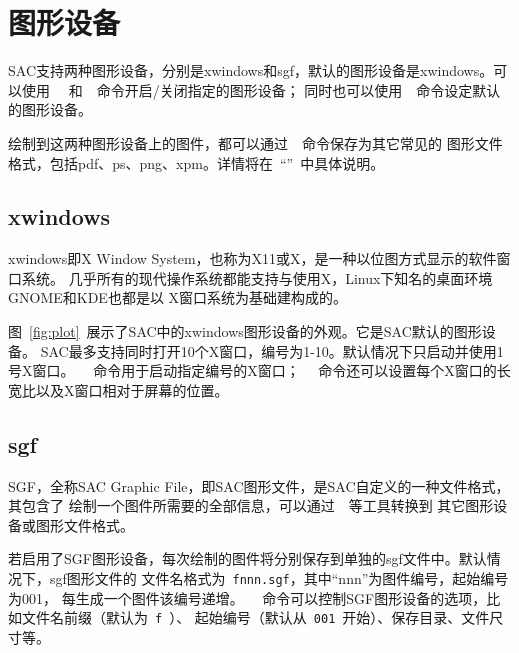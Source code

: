 \section{图形设备}
SAC支持两种图形设备，分别是xwindows和sgf，默认的图形设备是xwindows。可以使用
~~和~~命令开启/关闭指定的图形设备；
同时也可以使用~~命令设定默认的图形设备。

绘制到这两种图形设备上的图件，都可以通过~~命令保存为其它常见的
图形文件格式，包括pdf、ps、png、xpm。详情将在~``''~中具体说明。

\subsection{xwindows}
xwindows即X Window System，也称为X11或X，是一种以位图方式显示的软件窗口系统。
几乎所有的现代操作系统都能支持与使用X，Linux下知名的桌面环境GNOME和KDE也都是以
X窗口系统为基础建构成的。

图~\ref{fig:plot}~展示了SAC中的xwindows图形设备的外观。它是SAC默认的图形设备。
SAC最多支持同时打开10个X窗口，编号为1-10。默认情况下只启动并使用1号X窗口。
~~命令用于启动指定编号的X窗口；
~~命令还可以设置每个X窗口的长宽比以及X窗口相对于屏幕的位置。

\subsection{sgf}
SGF，全称SAC Graphic File，即SAC图形文件，是SAC自定义的一种文件格式，其包含了
绘制一个图件所需要的全部信息，可以通过~~等工具转换到
其它图形设备或图形文件格式。

若启用了SGF图形设备，每次绘制的图件将分别保存到单独的sgf文件中。默认情况下，sgf图形文件的
文件名格式为~\verb+fnnn.sgf+，其中``nnn''为图件编号，起始编号为001，
每生成一个图件该编号递增。
~~命令可以控制SGF图形设备的选项，比如文件名前缀（默认为~\verb+f+~）、
起始编号（默认从~\verb+001+~开始）、保存目录、文件尺寸等。
